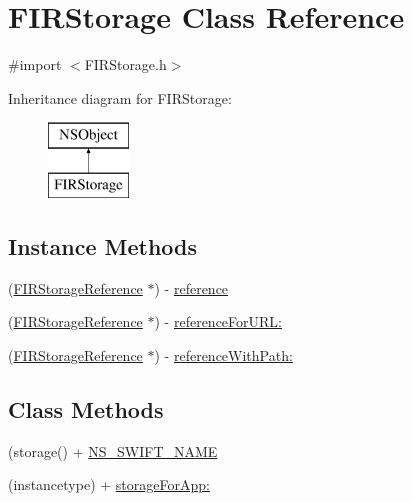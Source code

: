 \hypertarget{interface_f_i_r_storage}{}\section{F\+I\+R\+Storage Class Reference}
\label{interface_f_i_r_storage}


{\ttfamily \#import $<$F\+I\+R\+Storage.\+h$>$}

Inheritance diagram for F\+I\+R\+Storage\+:\begin{figure}[H]
\begin{center}
\leavevmode
\includegraphics[height=2.000000cm]{interface_f_i_r_storage}
\end{center}
\end{figure}
\subsection*{Instance Methods}
\begin{DoxyCompactItemize}
\item 
(\hyperlink{interface_f_i_r_storage_reference}{F\+I\+R\+Storage\+Reference} $\ast$) -\/ \hyperlink{interface_f_i_r_storage_a76c8a90c5f009f90eca7a0d2c9659577}{reference}
\item 
(\hyperlink{interface_f_i_r_storage_reference}{F\+I\+R\+Storage\+Reference} $\ast$) -\/ \hyperlink{interface_f_i_r_storage_a1025aff31aa13bd0c46ea0fc95aa8f34}{reference\+For\+U\+R\+L\+:}
\item 
(\hyperlink{interface_f_i_r_storage_reference}{F\+I\+R\+Storage\+Reference} $\ast$) -\/ \hyperlink{interface_f_i_r_storage_a33517f32be6d260ffe4c029bc866210f}{reference\+With\+Path\+:}
\end{DoxyCompactItemize}
\subsection*{Class Methods}
\begin{DoxyCompactItemize}
\item 
(storage() + \hyperlink{interface_f_i_r_storage_acf8749ecdcad4629aa32f25b6d1aa002}{N\+S\+\_\+\+S\+W\+I\+F\+T\+\_\+\+N\+A\+M\+E}
\item 
(instancetype) + \hyperlink{interface_f_i_r_storage_ac6d604da3e215033f3f2fdb47b603249}{storage\+For\+App\+:}
\end{DoxyCompactItemize}
